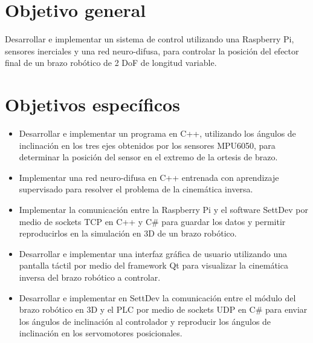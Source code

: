 \section{Objetivo general}

Desarrollar e implementar un sistema de control utilizando una Raspberry Pi, sensores inerciales y una red neuro-difusa, para controlar la posición del efector final de un brazo robótico de 2 DoF de longitud variable.

\newpage
\section{Objetivos específicos}
\begin{itemize}
	
	\item Desarrollar e implementar un programa en C++, utilizando los ángulos de inclinación en los tres ejes obtenidos por los sensores MPU6050, para determinar la posición del sensor en el extremo de la ortesis de brazo.
	
	\item Implementar una red neuro-difusa en C++ entrenada con aprendizaje supervisado para resolver el problema de la cinemática inversa.
	
	\item Implementar la comunicación entre la Raspberry Pi y el software SettDev por medio de sockets TCP en C++ y C\# para guardar los datos y permitir reproducirlos en la simulación en 3D de un brazo robótico.
	
	\item Desarrollar e implementar una interfaz gráfica de usuario utilizando una pantalla táctil por medio del framework Qt para visualizar la cinemática inversa del brazo robótico a controlar.
	
	\item Desarrollar e implementar en SettDev la comunicación entre el módulo del brazo robótico en 3D y el PLC por medio de sockets UDP en C\# para enviar los ángulos de inclinación al controlador y reproducir los ángulos de inclinación en los servomotores posicionales.
	
\end{itemize}